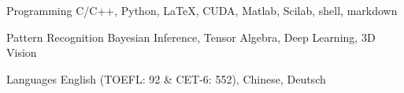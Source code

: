


\begin{cvskills}


\cvskill
{Programming} %
{C/C++, Python, LaTeX, CUDA, Matlab, Scilab, shell, markdown} %


\cvskill
{Pattern Recognition} %
{Bayesian Inference, Tensor Algebra, Deep Learning, 3D Vision} %


\cvskill
{Languages} %
{English (TOEFL: 92 \& CET-6: 552), Chinese, Deutsch} %


\end{cvskills}
